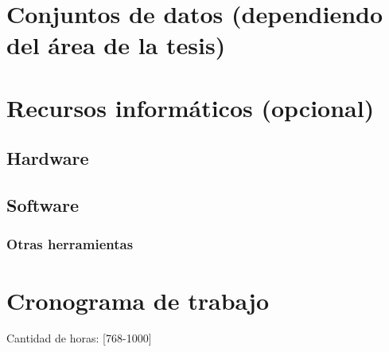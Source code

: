 \documentclass[12pt]{article}
\begin{document}
\bigskip

\section{Conjuntos de datos (dependiendo del área de la tesis)}

\bigskip

\section{Recursos informáticos (opcional)}

\subsection{Hardware}

\subsection{Software}

\subsubsection{Otras herramientas}

\bigskip

\section{Cronograma de trabajo}

Cantidad de horas: [768-1000]

\bigskip
\end{document}
